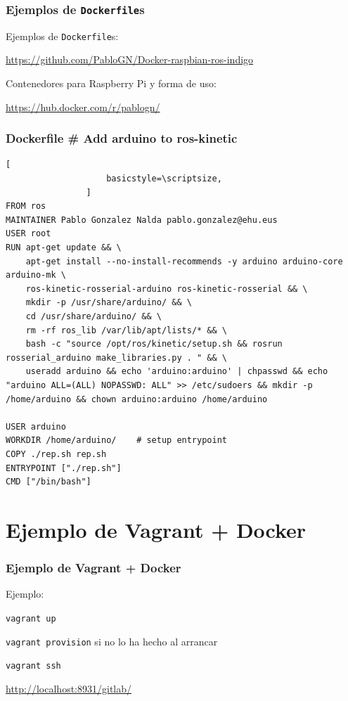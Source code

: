 \documentclass[xcolor=dvipsnames]{beamer}
\begin{document}
\begin{frame}[fragile]
	\frametitle{Ejemplos de \texttt{Dockerfile}s}
	Ejemplos de \texttt{Dockerfile}s:
	
	\url{https://github.com/PabloGN/Docker-raspbian-ros-indigo}
	
	Contenedores para Raspberry Pi y forma de uso:
	
	\url{https://hub.docker.com/r/pablogn/}

\end{frame}

\begin{frame}[fragile]
	\frametitle{Dockerfile \# Add arduino to ros-kinetic}
	
		\begin{lstlisting}[
				    basicstyle=\scriptsize,
				]
FROM ros
MAINTAINER Pablo Gonzalez Nalda pablo.gonzalez@ehu.eus
USER root
RUN apt-get update && \
	apt-get install --no-install-recommends -y arduino arduino-core arduino-mk \
	ros-kinetic-rosserial-arduino ros-kinetic-rosserial && \
	mkdir -p /usr/share/arduino/ && \
	cd /usr/share/arduino/ && \
	rm -rf ros_lib /var/lib/apt/lists/* && \
	bash -c "source /opt/ros/kinetic/setup.sh && rosrun rosserial_arduino make_libraries.py . " && \
	useradd arduino && echo 'arduino:arduino' | chpasswd && echo "arduino ALL=(ALL) NOPASSWD: ALL" >> /etc/sudoers && mkdir -p /home/arduino && chown arduino:arduino /home/arduino

USER arduino
WORKDIR /home/arduino/    # setup entrypoint
COPY ./rep.sh rep.sh
ENTRYPOINT ["./rep.sh"]
CMD ["/bin/bash"]
		\end{lstlisting}
\end{frame}

\section{Ejemplo de Vagrant + Docker}
\begin{frame}[fragile]
	\frametitle{Ejemplo de Vagrant + Docker}
	Ejemplo:
	
	\texttt{vagrant up}

	\texttt{vagrant provision} si no lo ha hecho al arrancar
	
	\texttt{vagrant ssh}
	
	\url{http://localhost:8931/gitlab/}
	
\end{frame}




%	
\end{document}
